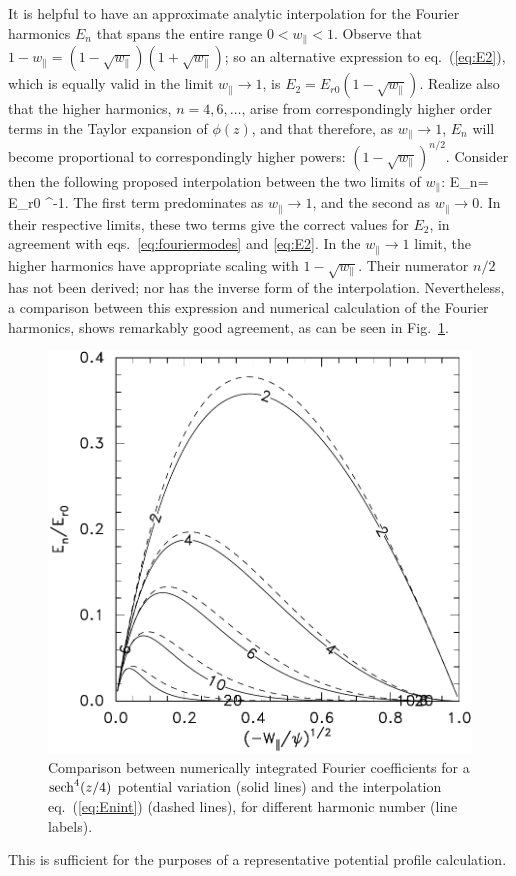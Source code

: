 \documentclass{agujournal2019}
\let\oldequation\equation
\let\oldendequation\endequation
\renewenvironment{equation}
  {\linenomathNonumbers\oldequation}
  {\oldendequation\endlinenomath}
\def\wp{w_\parallel}
\begin{document}
It is helpful to have an approximate analytic interpolation for the Fourier
harmonics $E_n$ that spans the entire range $0<\wp<1$. Observe
that $1-\wp=(1-\sqrt{\wp})(1+\sqrt{\wp})$; so
an alternative expression to eq.\ (\ref{eq:E2}), which is equally
valid in the limit $\wp\to 1$, is
$E_2=E_{r0}(1-\sqrt{\wp})$. Realize also that the higher
harmonics, $n=4,6,\dots$, arise from correspondingly higher order
terms in the Taylor expansion of $\phi(z)$, and that therefore, as 
$\wp\to 1$, $E_n$ will become proportional to correspondingly
higher powers:
$(1-\sqrt{\wp})^{n/2}$. Consider then the following proposed interpolation
between the two limits of $\wp$:
\begin{equation}
  \label{eq:Enint}
  E_n= E_{r0} \left[ {n/2\over(1-\sqrt{\wp})^{n/2}} + {\pi\over8}{1\over\sqrt{\wp}}\right]^{-1}.
\end{equation}
The first term predominates as $\wp\to1$, and the second as
$\wp\to0$. In their respective limits, these two terms give
the correct values for $E_2$, in agreement with eqs.\
\ref{eq:fouriermodes} and \ref{eq:E2}. In the $\wp\to1$ limit,
the higher harmonics have appropriate scaling with
$1-\sqrt{\wp}$. Their numerator $n/2$ has not been
derived; nor has the inverse form of the
interpolation. Nevertheless, a comparison between this expression and
numerical calculation of the Fourier harmonics, shows remarkably good
agreement, as can be seen in Fig.\ \ref{fig:Enint}.
\begin{figure}%
  \centering
  \includegraphics[width=0.6\hsize]{EnvW}
  \caption{Comparison between numerically integrated Fourier
    coefficients for a ${\rm sech}^4(z/4)$ potential variation (solid
    lines) and the interpolation eq.\ (\ref{eq:Enint}) (dashed lines),
    for different harmonic number (line labels).}
  \label{fig:Enint}
\end{figure}
This is sufficient for the purposes of a
representative potential profile calculation.
\end{document}
